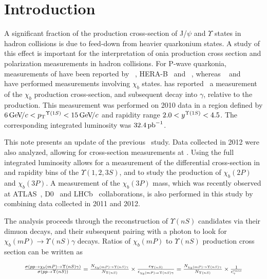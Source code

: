 \section{Introduction}
\label{sec:introduction}

A significant fraction of the production cross-section of J/$\psi$ and
$\Upsilon$ states in hadron collisions is due to feed-down from heavier
quarkonium states. A study of this effect is important for the interpretation of
onia production cross section and polarization measurements in hadron
collisions. For P-wave quarkonia, measurements of \chic have been reported by
\cdf~\cite{Abulencia:2007bra}, HERA-B~\cite{Abt:2008ed}
and \lhcb~\cite{LHCb-PAPER-2011-019}, whereas \cdf~\cite{Affolder:1999wm} and 
\atlas~\cite{Aad:2011ih} have performed measurements involving $\chi_b$ states.
\lhcb has reported~\cite{LHCb-PAPER-2012-015} a measurement of
the $\chi_b$ production cross-section, and subsequent decay into \OneS $\gamma$,
relative to the \OneS production. This measurement was performed on 2010 data
in a region defined by $6 \gevc < \pt^{\Y1S} < 15 \gevc$ and rapidity range
$2.0 < y^{\Y1S} < 4.5$.
The corresponding integrated luminosity was $32.4\mbox{\,pb}^{-1}$.

This note presents an update of the previous \lhcb\ study. Data collected in
2012 were also analyzed, allowing for cross-section measurements at \tev.
Using the full integrated luminosity allows for a measurement of the
differential cross-section in \pt and rapidity bins of the $\Upsilon(1,2,3S)$,
and to study the production of $\chi_b(2P)$ and $\chi_b(3P)$. A measurement of
the $\chi_b(3P)$ mass, which was recently observed at ATLAS~\cite{Aad:2011ih},
D0~\cite{Abazov:2012gh} and LHCb~\cite{LHCb-CONF-2012-020} collaborations, is
also performed in this study by combining data collected in 2011 and 2012.

The analysis proceeds through the reconstruction of $\Upsilon(nS)$ candidates
via their dimuon decays, and their subsequent pairing with a photon to look for
$\chi_b(mP) \to \Upsilon(nS) \gamma$ decays. Ratios of $\chi_b(mP)$ to
$\Upsilon(nS)$ production cross section can be written as

\begin{equation}
\resizebox{.9\hsize}{!}{
$
\frac{\sigma(pp \to \chi_b (mP) \to \Upsilon(nS) \gamma)}{\sigma(pp \to \Upsilon(nS))} =
\frac{N_{\chi_b (mP)\to \Upsilon(nS) \gamma}}{N_{\Upsilon(nS)}} \times \frac{\epsilon_{\Upsilon(nS)}}{\epsilon_{\chi_b (mP)\to \Upsilon(nS) \gamma}} =
\frac{N_{\chi_b (mP)\to \Upsilon(nS) \gamma}}{N_{\Upsilon(nS)}} \times \frac{1}{\epsilon^{reco}_{\gamma}}
$
}
\label{eqn:master}
\end{equation}


